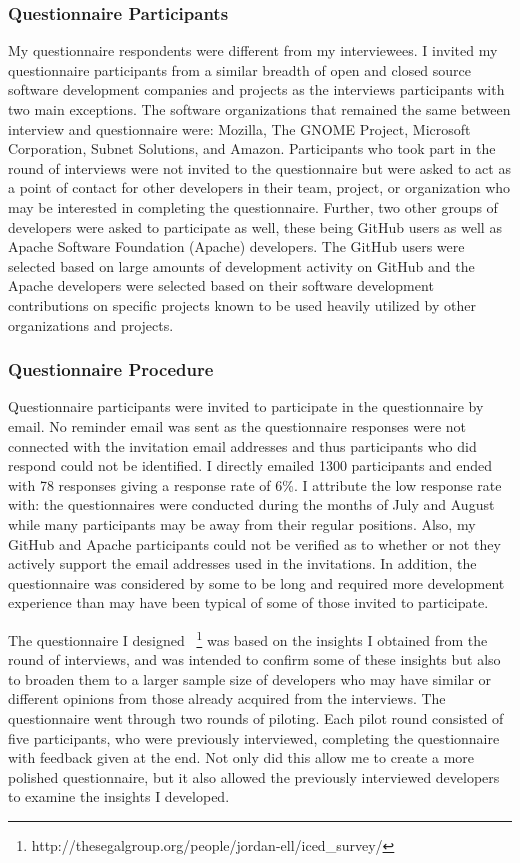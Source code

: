 \subsubsection{Questionnaire Participants}

My questionnaire respondents were different from my interviewees. I invited my questionnaire participants from a similar breadth of open and closed source software development 
companies and projects as the interviews participants with two main exceptions. The software organizations
that remained the same between interview and questionnaire were: Mozilla, The GNOME Project, Microsoft Corporation, 
Subnet Solutions, and Amazon.
Participants who took part in the round of interviews were not invited to the questionnaire but were asked to act as a point of contact for other 
developers in their team, project, or organization who may be interested
in completing the questionnaire. Further, two other groups of developers were asked to
participate as well, these being GitHub users as well as Apache Software Foundation (Apache) developers. The GitHub
users were selected based on large amounts of development activity on GitHub and the Apache developers
were selected based on their software development contributions on specific projects known to be used heavily
utilized by other organizations and projects.

\subsubsection{Questionnaire Procedure}

Questionnaire participants were invited to participate in the questionnaire by email. No reminder email was sent as the
questionnaire responses were not connected with the invitation email addresses and thus participants who did respond
could not be identified. I directly emailed 1300 participants and ended with 78 responses
giving a response rate of 6\%. I attribute the low response rate with: the questionnaires
were conducted during the months of July and August while many participants may be away from their regular positions.
Also, my GitHub and Apache participants could not be verified as to whether or not they actively support the
email addresses used in the invitations. In addition, the questionnaire was considered by some to be long and required
more development experience than may have been typical of some of those invited to participate.

The questionnaire I designed ~\footnote{http://thesegalgroup.org/people/jordan-ell/iced\_survey/}
was based on the insights I obtained from the round of interviews, and was intended to confirm some of these insights but also to broaden them to a larger sample size of developers who may have similar
or different opinions from those already acquired from the interviews. The questionnaire went through two rounds of
piloting. Each pilot round consisted of five participants, who were previously interviewed, completing the questionnaire
with feedback given at the end. Not only did this allow me to create a more polished questionnaire, but it also allowed 
the previously interviewed developers to examine the insights I developed. 

